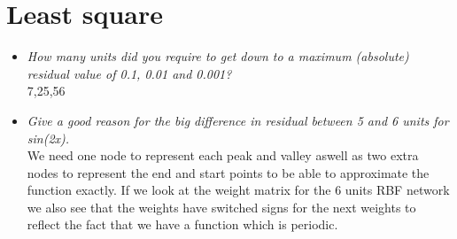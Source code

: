 \documentclass[a4paper,11pt]{article}
\begin{document}
\section{Least square}
\begin{itemize}

\item \textit{How many units did you require to get down to a maximum (absolute) residual value of 0.1, 0.01 and 0.001?} \\
7,25,56

\begin{figure}[h!]
\label{fig1}
\caption{}
\end{figure}

\item \textit{Give a good reason for the big difference in residual between 5 and 6 units for sin(2x).}  \\
We need one node to represent each peak and valley aswell as two extra nodes to represent the end and start points to be able to approximate the function exactly. If we look at the weight matrix for the 6 units RBF network we also see that the weights have switched signs for the next weights to reflect the fact that we have a function which is periodic.


\end{itemize}
\end{document}

